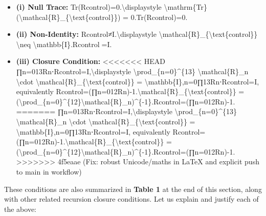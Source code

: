 \documentclass[]{article}
\begin{document}
{\begin{itemize}
\item
  \textbf{(i) Null Trace:} Tr(Rcontrol)=0.\textbackslash{}displaystyle
  \textbackslash{}mathrm\{Tr\}(\textbackslash{}mathcal\{R\}\_\{\textbackslash{}text\{control\}\})
  = 0.Tr(Rcontrol​)=0.
\item
  \textbf{(ii) Non-Identity:} Rcontrol≠I.\textbackslash{}displaystyle
  \textbackslash{}mathcal\{R\}\_\{\textbackslash{}text\{control\}\}
  \textbackslash{}neq \textbackslash{}mathbb\{I\}.Rcontrol​=I.
\item
  \textbf{(iii) Closure Condition:}
<<<<<<< HEAD
  ∏n=013Rn⋅Rcontrol=I,\textbackslash displaystyle
  \textbackslash prod\_\{n=0\}\^{}\{13\} \textbackslash mathcal\{R\}\_n
  \textbackslash cdot
  \textbackslash mathcal\{R\}\_\{\textbackslash text\{control\}\} =
  \textbackslash mathbb\{I\},n=0∏13\hspace{0pt}Rn\hspace{0pt}⋅Rcontrol\hspace{0pt}=I,
  equivalently
  Rcontrol=(∏n=012Rn)-1.\textbackslash mathcal\{R\}\_\{\textbackslash text\{control\}\}
  =
  (\textbackslash prod\_\{n=0\}\^{}\{12\}\textbackslash mathcal\{R\}\_n)\^{}\{-1\}.Rcontrol\hspace{0pt}=(∏n=012\hspace{0pt}Rn\hspace{0pt})-1.
=======
  ∏n=013Rn⋅Rcontrol=I,\textbackslash{}displaystyle
  \textbackslash{}prod\_\{n=0\}\^{}\{13\}
  \textbackslash{}mathcal\{R\}\_n \textbackslash{}cdot
  \textbackslash{}mathcal\{R\}\_\{\textbackslash{}text\{control\}\} =
  \textbackslash{}mathbb\{I\},n=0∏13​Rn​⋅Rcontrol​=I, equivalently
  Rcontrol=(∏n=012Rn)-1.\textbackslash{}mathcal\{R\}\_\{\textbackslash{}text\{control\}\}
  =
  (\textbackslash{}prod\_\{n=0\}\^{}\{12\}\textbackslash{}mathcal\{R\}\_n)\^{}\{-1\}.Rcontrol​=(∏n=012​Rn​)-1.
>>>>>>> 4f5eaae (Fix: robust Unicode/maths in LaTeX and explicit push to main in workflow)
\end{itemize}

These conditions are also summarized in \textbf{Table 1} at the end of
this section, along with other related recursion closure conditions. Let
us explain and justify each of the above:

}
\end{document}
